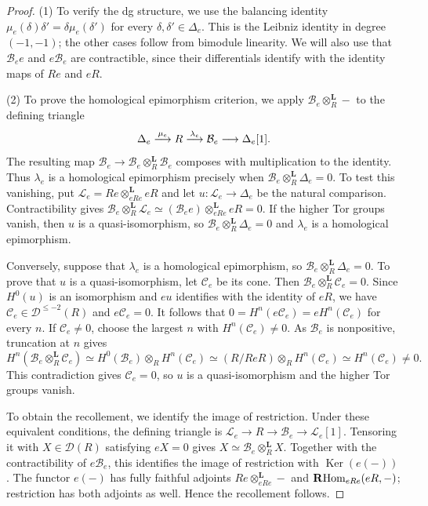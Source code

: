 \documentclass[11pt]{article}
\begin{document}
\begin{proof}
\textup{(1)} To verify the dg structure, we use the balancing identity
$\mu_e(\delta)\delta'=\delta\mu_e(\delta')$ for
every $\delta,\delta'\in\Delta_e$. This is the Leibniz identity in
degree $(-1,-1)$; the other cases follow from bimodule linearity.
We will also use that $\mathcal B_e e$ and $e\mathcal B_e$
are contractible, since their differentials identify with the
identity maps of $Re$ and $eR$.

\textup{(2)} To prove the homological epimorphism criterion, we apply
$\mathcal B_e\otimes_R^{\mathbf L}-$ to the defining triangle
\[
 \Delta_e\stackrel{\mu_e}{\longrightarrow}R\stackrel{\lambda_e}{\longrightarrow}\mathcal B_e
 \longrightarrow\Delta_e[1].
\]
The resulting map
$\mathcal B_e\to\mathcal B_e\otimes_R^{\mathbf L}\mathcal B_e$
composes with multiplication to the identity. Thus $\lambda_e$
is a homological epimorphism precisely when
$\mathcal B_e\otimes_R^{\mathbf L}\Delta_e=0$.
To test this vanishing, put
$\mathcal L_e=Re\otimes_{eRe}^{\mathbf L}eR$ and let
$u:\mathcal L_e\to\Delta_e$ be the natural comparison.
Contractibility gives
$\mathcal B_e\otimes_R^{\mathbf L}\mathcal L_e
\simeq(\mathcal B_e e)\otimes_{eRe}^{\mathbf L}eR=0$.
If the higher Tor groups vanish, then $u$ is a quasi-isomorphism,
so $\mathcal B_e\otimes_R^{\mathbf L}\Delta_e=0$ and
$\lambda_e$ is a homological epimorphism.

Conversely, suppose that $\lambda_e$ is a homological epimorphism,
so $\mathcal B_e\otimes_R^{\mathbf L}\Delta_e=0$.
To prove that $u$ is a quasi-isomorphism, let $\mathcal C_e$ be its cone.
Then
$\mathcal B_e\otimes_R^{\mathbf L}\mathcal C_e=0$.
Since $H^0(u)$ is an isomorphism and $eu$ identifies with the
identity of $eR$, we have $\mathcal C_e\in\mathscr D^{\le-2}(R)$
and $e\mathcal C_e=0$.
It follows that $0=H^n(e\mathcal C_e)=eH^n(\mathcal C_e)$ for every $n$.
If $\mathcal C_e\ne0$, choose the largest $n$ with
$H^n(\mathcal C_e)\ne0$. As $\mathcal B_e$ is nonpositive,
truncation at $n$ gives
\[
 H^n(\mathcal B_e\otimes_R^{\mathbf L}\mathcal C_e)
 \simeq H^0(\mathcal B_e)\otimes_R H^n(\mathcal C_e)
 \simeq (R/ReR)\otimes_R H^n(\mathcal C_e)
 \simeq H^n(\mathcal C_e)\ne0.
\]
This contradiction gives $\mathcal C_e=0$, so $u$ is a
quasi-isomorphism and the higher Tor groups vanish.

To obtain the recollement, we identify the image of restriction.
Under these equivalent conditions, the defining triangle is
$\mathcal L_e\to R\to\mathcal B_e\to\mathcal L_e[1]$.
Tensoring it with $X\in\mathscr D(R)$ satisfying $eX=0$ gives
$X\simeq\mathcal B_e\otimes_R^{\mathbf L}X$.
Together with the contractibility of $e\mathcal B_e$, this identifies
the image of restriction with $\operatorname{Ker}(e(-))$.
The functor $e(-)$ has fully faithful adjoints
$Re\otimes_{eRe}^{\mathbf L}-$ and
$\mathbf R{\rm Hom}_{eRe}(eR,-)$; restriction has both adjoints as well.
Hence the recollement follows.
\end{proof}
\end{document}
